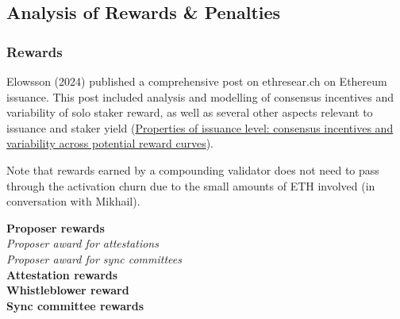 \subsection{Analysis of Rewards \& Penalties}
\subsubsection{Rewards}
Elowsson (2024) published a comprehensive post on ethresear.ch on Ethereum issuance. This post included analysis and modelling of consensus incentives and variability of solo staker reward, as well as several other aspects relevant to issuance and staker yield (\href{https://ethresear.ch/t/properties-of-issuance-level-consensus-incentives-and-variability-across-potential-reward-curves/18448}{Properties of issuance level: consensus incentives and variability across potential reward curves}).

Note that rewards earned by a compounding validator does not need to pass through the activation churn due to the small amounts of ETH involved (in conversation with Mikhail).

\noindent
\textbf{Proposer rewards} \\

\noindent
\textit{Proposer award for attestations} \\


\noindent
\textit{Proposer award for sync committees} \\




\noindent
\textbf{Attestation rewards} \\



\noindent
\textbf{Whistleblower reward} \\


\noindent
\textbf{Sync committee rewards} \\


